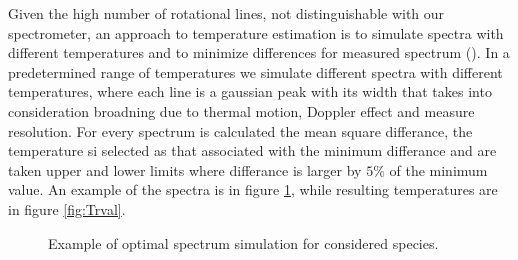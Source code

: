 Given the high number of rotational lines, not distinguishable with our spectrometer, an approach to temperature estimation is to simulate spectra with different temperatures and to minimize differences for measured spectrum (\cite{Izarra_2000}).
In a predetermined range of temperatures we simulate different spectra with different temperatures, where each line is a gaussian peak with its width that takes into consideration broadning due to thermal motion, Doppler effect and measure resolution. For every spectrum is calculated the mean square differance, the temperature si selected as that associated with the minimum differance and are taken upper and lower limits where differance is larger by $5\%$ of the minimum value. An example of the spectra is in figure \ref{fig:Trfit}, while resulting temperatures are in figure \ref{fig:Trval}.
\begin{figure}
\centering
  \hfill
 \caption{Example of optimal spectrum simulation for considered species.}
 \label{fig:Trfit}
\end{figure}


